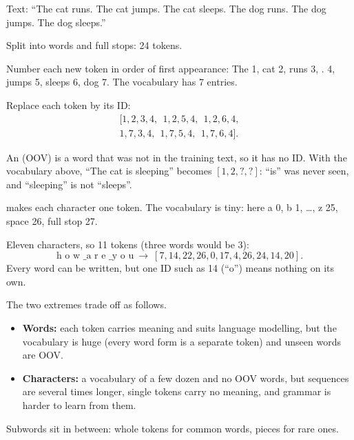 \begin{example}
Text: ``The cat runs. The cat jumps. The cat sleeps. The dog runs. The dog jumps. The dog sleeps.''
\begin{steps}
  \item Split into words and full stops: 24 tokens.
  \item Number each new token in order of first appearance: The 1, cat 2, runs 3, . 4, jumps 5, sleeps 6, dog 7. The vocabulary has 7 entries.
  \item Replace each token by its ID:
  \[\begin{gathered}{}[1, 2, 3, 4,\ \ 1, 2, 5, 4,\ \ 1, 2, 6, 4,\\ 1, 7, 3, 4,\ \ 1, 7, 5, 4,\ \ 1, 7, 6, 4].\end{gathered}\]
\end{steps}
\end{example}

\begin{definition}
An  (OOV) is a word that was not in the training text, so it has no ID. With the vocabulary above, ``The cat is sleeping'' becomes $[1, 2, ?, ?]$: ``is'' was never seen, and ``sleeping'' is not ``sleeps''.
\end{definition}

\begin{definition}
 makes each character one token. The vocabulary is tiny: here a 0, b 1, \dots, z 25, space 26, full stop 27.
\end{definition}

\begin{example}
Eleven characters, so 11 tokens (three words would be 3):
\[
\text{h o w \_ a r e \_ y o u} \ \to\ [7, 14, 22, 26, 0, 17, 4, 26, 24, 14, 20].
\]
Every word can be written, but one ID such as 14 (``o'') means nothing on its own.
\end{example}

\begin{result}
The two extremes trade off as follows.
\begin{itemize}
  \item \textbf{Words:} each token carries meaning and suits language modelling, but the vocabulary is huge (every word form is a separate token) and unseen words are OOV.
  \item \textbf{Characters:} a vocabulary of a few dozen and no OOV words, but sequences are several times longer, single tokens carry no meaning, and grammar is harder to learn from them.
\end{itemize}
Subwords sit in between: whole tokens for common words, pieces for rare ones.
\end{result}


